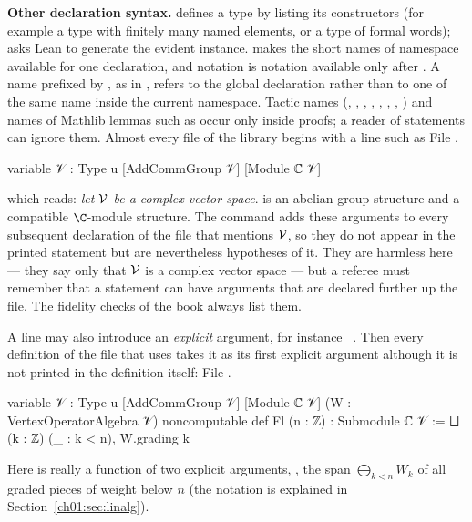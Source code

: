\textbf{Other declaration syntax.}  defines a type by listing its constructors (for
example a type with finitely many named elements, or a type of formal words);  asks Lean to generate the evident instance.  makes the short names of
namespace  available for one declaration, and  notation is notation available
only after . A name prefixed by , as in , refers to the
global declaration rather than to one of the same name inside the current namespace. Tactic names
(, , , , , , , )
and names of Mathlib lemmas such as  occur only inside proofs; a reader of statements
can ignore them.
Almost every file of the library begins with a line such as
\noindent File .
\begin{leancode}
variable {𝒱 : Type u} [AddCommGroup 𝒱] [Module ℂ 𝒱]
\end{leancode}
which reads: \emph{let $\mathcal{V}$ be a complex vector space}.  is an abelian
group structure and  a compatible $\C$-module structure. The 
command adds these arguments to every subsequent declaration of the file that mentions $\mathcal{V}$, so
they do not appear in the printed statement but are nevertheless hypotheses of it. They are harmless
here --- they say only that $\mathcal{V}$ is a complex vector space --- but a referee must remember that
a statement can have arguments that are declared further up the file. The fidelity checks of the
book always list them.


A  line may also introduce an \emph{explicit} argument, for instance
\allowbreak\ . Then every definition of the file that uses  takes
it as its first explicit argument although it is not printed in the definition itself:
\noindent File .
\begin{leancode}
variable {𝒱 : Type u} [AddCommGroup 𝒱] [Module ℂ 𝒱] (W : VertexOperatorAlgebra 𝒱)
noncomputable def Fl (n : ℤ) : Submodule ℂ 𝒱 := ⨆ (k : ℤ) (_ : k < n), W.grading k
\end{leancode}
Here  is really a function of two explicit arguments, , the span
$\bigoplus_{k<n}W_k$ of all graded pieces of weight below $n$ (the notation  is explained in
Section~\ref{ch01:sec:linalg}).


